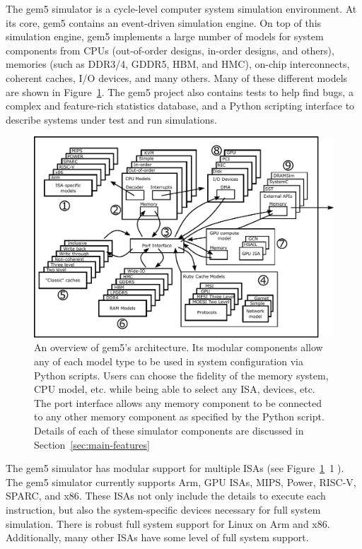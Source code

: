 The gem5 simulator is a cycle-level computer system simulation environment.
At its core, gem5 contains an event-driven simulation engine.
On top of this simulation engine, gem5 implements a large number of models for system components from CPUs (out-of-order designs, in-order designs, and others), memories (such as DDR3/4, GDDR5, HBM, and HMC), on-chip interconnects, coherent caches, I/O devices, and many others.
Many of these different models are shown in Figure~\ref{fig:gem5-big-picture}.
The gem5 project also contains tests to help find bugs, a complex and feature-rich statistics database, and a Python scripting interface to describe systems under test and run simulations.

\begin{figure}
  \centering
  \includegraphics[width=\textwidth]{fig/gem5-big-picture}
  \caption{An overview of gem5's architecture. Its modular components allow any of each model type to be used in system configuration via Python scripts. Users can choose the fidelity of the memory system, CPU model, etc. while being able to select any ISA, devices, etc. The port interface allows any memory component to be connected to any other memory component as specified by the Python script. Details of each of these simulator components are discussed in Section~\ref{sec:main-features}}
  \label{fig:gem5-big-picture}
\end{figure}

The gem5 simulator has modular support for multiple ISAs (see Figure~\ref{fig:gem5-big-picture}~\textcircled{1}).
The gem5 simulator currently supports Arm, GPU ISAs, MIPS, Power, RISC-V, SPARC, and x86.
These ISAs not only include the details to execute each instruction, but also the system-specific devices necessary for full system simulation.
There is robust full system support for Linux on Arm and x86.
Additionally, many other ISAs have some level of full system support.


